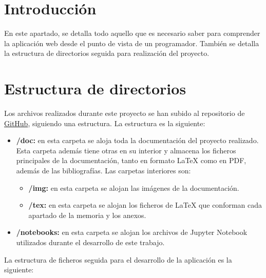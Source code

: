 
\section{Introducción}
En este apartado, se detalla todo aquello que es necesario saber para comprender la aplicación web desde el punto de vista de un programador. También se detalla la estructura de directorios seguida para realización del proyecto.

\section{Estructura de directorios}
Los archivos realizados durante este proyecto se han subido al repositorio de \href{https://github.com/xam1002/TFG_Deteccion_Parkinson}{GitHub}, siguiendo una estructura. La estructura es la siguiente:

\begin{itemize}
	\item \textbf{/doc:} en esta carpeta se aloja toda la documentación del proyecto realizado. Esta carpeta además tiene otras en su interior y almacena los ficheros principales de la documentación, tanto en formato \LaTeX{} como en PDF, además de las bibliografías. Las carpetas interiores son:
		\begin{itemize}
			\item \textbf{/img:} en esta carpeta se alojan las imágenes de la documentación.
			\item \textbf{/tex:} en esta carpeta se alojan los ficheros de \LaTeX{} que conforman cada apartado de la memoria y los anexos.
		\end{itemize}
	\item \textbf{/notebooks:} en esta carpeta se alojan los archivos de Jupyter Notebook utilizados durante el desarrollo de este trabajo.
\end{itemize}

La estructura de ficheros seguida para el desarrollo de la aplicación es la siguiente:

